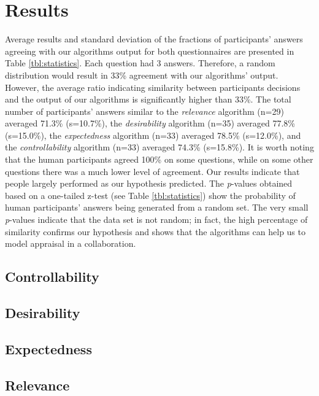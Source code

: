 \documentclass[12pt]{report}
\begin{document}
\section{Results}
\label{sec:results-crowdsourcing}
Average results and standard deviation of the fractions of participants' answers
agreeing with our algorithms output for both questionnaires are presented in
Table \ref{tbl:statistics}. Each question had 3 answers. Therefore, a random
distribution would result in 33\% agreement with our algorithms' output.
However, the average ratio indicating similarity between participants
decisions and the output of our algorithms is significantly higher than 33\%.
The total number of participants' answers similar to the \textit{relevance}
algorithm (n=29) averaged 71.3\% (s=10.7\%), the \textit{desirability}
algorithm (n=35) averaged 77.8\% (s=15.0\%), the \textit{expectedness}
algorithm (n=33) averaged 78.5\% (s=12.0\%), and the \textit{controllability}
algorithm (n=33) averaged 74.3\% (s=15.8\%). It is worth noting that the human
participants agreed 100\% on some questions, while on some other questions there
was a much lower level of agreement. Our results indicate that people largely
performed as our hypothesis predicted. The \textit{p}-values obtained based on a
one-tailed z-test (see Table \ref{tbl:statistics}) show the probability of human
participants' answers being generated from a random set. The very small
\textit{p}-values indicate that the data set is not random; in fact, the high
percentage of similarity confirms our hypothesis and shows that the algorithms
can help us to model appraisal in a collaboration.

\subsection{Controllability}
\label{sec:controllability-crowdsourcing}

\subsection{Desirability}
\label{sec:desirability-crowdsourcing}

\subsection{Expectedness}
\label{sec:expectedness-crowdsourcing}

\subsection{Relevance}
\label{sec:relevance-crowdsourcing}
\end{document}

